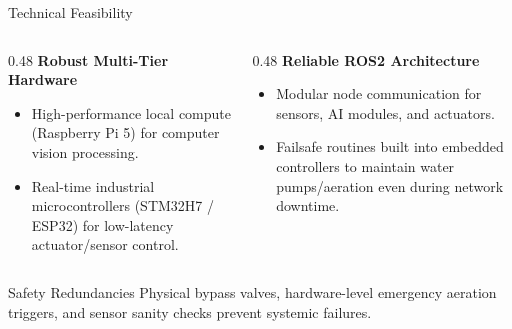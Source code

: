 \documentclass[aspectratio=169, 10pt]{beamer}
\begin{document}
\begin{frame}{Technical Feasibility}
  \begin{columns}[T]
    \begin{column}{0.48\textwidth}
      \textbf{Robust Multi-Tier Hardware}
      \begin{itemize}
        \item High-performance local compute (Raspberry Pi 5) for computer vision processing.
        \item Real-time industrial microcontrollers (STM32H7 / ESP32) for low-latency actuator/sensor control.
      \end{itemize}
    \end{column}
    
    \begin{column}{0.48\textwidth}
      \textbf{Reliable ROS2 Architecture}
      \begin{itemize}
        \item Modular node communication for sensors, AI modules, and actuators.
        \item Failsafe routines built into embedded controllers to maintain water pumps/aeration even during network downtime.
      \end{itemize}
    \end{column}
  \end{columns}

  \vspace{0.4cm}
  \begin{block}{Safety Redundancies}
    Physical bypass valves, hardware-level emergency aeration triggers, and sensor sanity checks prevent systemic failures.
  \end{block}
\end{frame}
\end{document}
